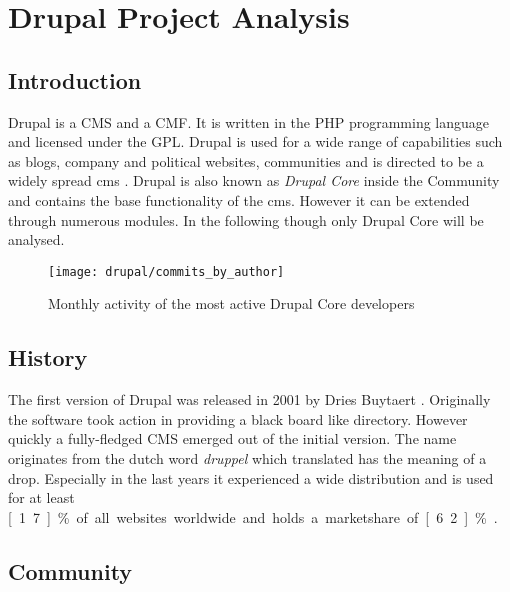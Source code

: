 \section{Drupal Project Analysis} %
\label{sec:Drupal Project Analysis}

\subsection{Introduction} %
\label{sub:Introduction}


Drupal is a \ac{CMS} and a \ac{CMF}. It is written in the PHP programming
language and licensed under the \ac{GPL}. Drupal is used for a wide range
of capabilities such as blogs, company and political websites, communities and
is directed to be a widely spread cms \cite{DrupalOverview}. Drupal is also
known as \emph{Drupal Core} inside the Community and contains the base
functionality of the cms. However it can be extended through numerous modules.
In the following though only Drupal Core will be analysed.

\begin{figure}[htbp]
  \centering
  \texttt{[image: drupal/commits\_by\_author]}
  \caption{Monthly activity of the most active Drupal Core developers}
\end{figure}


\subsection{History} %
\label{sub:History}

The first version of Drupal was released in 2001 by Dries Buytaert
\cite{DrupalHistory}. Originally the software took action in providing a black
board like directory. However quickly a fully-fledged \ac{CMS} emerged out of
the initial version. The name originates from the dutch word \emph{druppel}
which translated has the meaning of a drop. Especially in the last years it
experienced a wide distribution and is used for at least \unit[1.7]{\%} of all
websites worldwide and holds a marketshare of \unit[6.2]{\%}
\cite{DrupalBuiltWith,DrupalW3Techs}.


\subsection{Community} %
\label{sub:Community}

